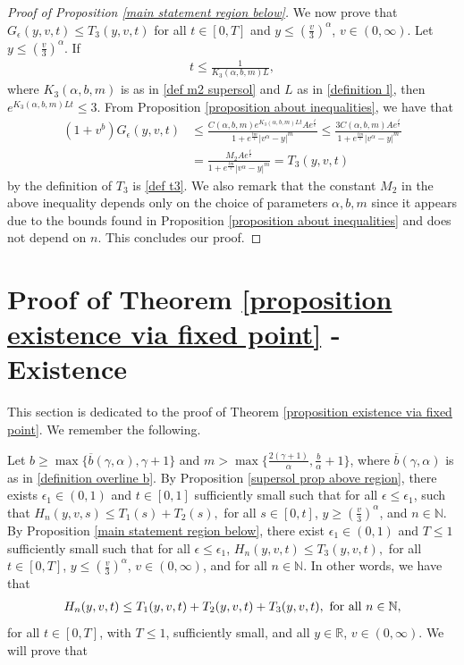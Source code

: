 \documentclass[11pt]{article}
\numberwithin{equation}{section}
\begin{document}
\begin{proof}[Proof of Proposition \ref{main statement region below}]
We now prove that  $G_{\epsilon}(y,v,t)\leq T_{3}(y,v,t)$ for all $t\in[0,T]$ and $y\leq (\frac{v}{3})^{\alpha}$, $v\in(0,\infty)$. Let $y\leq (\frac{v}{3})^{\alpha}$. If 
\begin{align}\label{definition time supersol}
    t\leq \frac{1}{K_{3}(\alpha,b,m)L },
\end{align} where $K_{3}(\alpha,b,m)$ is as in \eqref{def m2 supersol} and $L$ as in \eqref{definition l}, then $e^{K_{3}(\alpha,b,m)L t}\leq 3$.  From Proposition \ref{proposition about inequalities}, we have that
\begin{align}
  (1+v^{b})  G_{\epsilon}(y,v,t)&\leq \frac{C(\alpha,b,m)e^{K_{3}(\alpha,b,m)L t}Ae^{\frac{t}{\epsilon}}}{1+e^{\frac{tm}{\epsilon}}|v^{\alpha}-y|^{m}}\leq \frac{3 C(\alpha,b,m)A e^{\frac{t}{\epsilon}}}{1+e^{\frac{tm}{\epsilon}}|v^{\alpha}-y|^{m}}\nonumber\\
  &= \frac{M_{2}Ae^{\frac{t}{\epsilon}}}{1+e^{\frac{tm}{\epsilon}}|v^{\alpha}-y|^{m}}=T_{3}(y,v,t)\label{def m2}
\end{align}
by the definition of $T_{3}$ is \eqref{def t3}. We also remark that the constant $M_{2}$ in the above inequality depends only on the choice of parameters $\alpha,  b,m$ since it appears due to the bounds found in Proposition \ref{proposition about inequalities}  and does not depend on $n$. This concludes our proof.
\end{proof}

\section{Proof of Theorem \ref{proposition existence via fixed point} - Existence}\label{section five}
This section is dedicated to the proof of Theorem 
\ref{proposition existence via fixed point}. We remember the following.


Let   $b\geq \max\{\overline{b}(\gamma,\alpha),\gamma+1\}$ and $m>\max\{\frac{2(\gamma+1)}{\alpha},\frac{b}{\alpha}+1\}$, where  $\overline{b}(\gamma,\alpha)$ is as in \eqref{definition overline b}. By Proposition \ref{supersol prop above region},  there exists $\epsilon_{1}\in(0,1)$ and $t\in[0,1]$ sufficiently small such that for all $\epsilon\leq \epsilon_{1}$, such that $H_{n}(y,v,s)\leq T_{1}(s)+T_{2}(s),$ for all $s\in[0,t]$, $y\geq (\frac{v}{3})^{\alpha}$, and $n\in\mathbb{N}$. By Proposition \ref{main statement region below}, there exist $\epsilon_{1}\in(0,1)$ and $T\leq 1$ sufficiently small such that for all $\epsilon\leq \epsilon_{1}$, $H_{n}(y,v,t)\leq T_{3}(y,v,t),$ for all $t\in[0,T]$, $y\leq (\frac{v}{3})^{\alpha}$, $v\in(0,\infty)$, and for all $n\in\mathbb{N}$. In other words, we have that
\begin{align}
H_{n}(y,v,t)\leq T_{1}(y,v,t)+T_{2}(y,v,t)+T_{3}(y,v,t), \textup{ for all } n\in\mathbb{N},
\end{align}
for all $t\in[0,T]$, with $T\leq 1$, sufficiently small, and all $y\in\mathbb{R}$, $v\in(0,\infty)$. We will prove that
\end{document}
